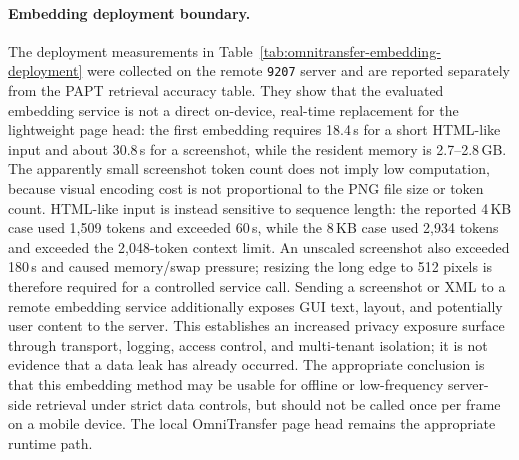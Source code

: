 \begin{table}[t]
  \centering
  \scriptsize
  \caption{Embedding deployment feasibility on the remote \texttt{9207} server.}
  \label{tab:omnitransfer-embedding-deployment}
\end{table}

\paragraph{Embedding deployment boundary.}
The deployment measurements in Table~\ref{tab:omnitransfer-embedding-deployment}
were collected on the remote \texttt{9207} server and are reported separately from the
PAPT retrieval accuracy table.  They show that the evaluated embedding service
is not a direct on-device, real-time replacement for the lightweight page head:
the first embedding requires 18.4\,s for a short HTML-like input and about
30.8\,s for a screenshot, while the resident memory is 2.7--2.8\,GB.  The
apparently small screenshot token count does not imply low computation, because
visual encoding cost is not proportional to the PNG file size or token count.
HTML-like input is instead sensitive to sequence length: the reported 4\,KB
case used 1,509 tokens and exceeded 60\,s, while the 8\,KB case used 2,934
tokens and exceeded the 2,048-token context limit.  An unscaled screenshot also
exceeded 180\,s and caused memory/swap pressure; resizing the long edge to 512
pixels is therefore required for a controlled service call.  Sending a
screenshot or XML to a remote embedding service additionally exposes GUI text,
layout, and potentially user content to the server.  This establishes an
increased privacy exposure surface through transport, logging, access control,
and multi-tenant isolation; it is not evidence that a data leak has already
occurred.  The appropriate conclusion is that this embedding method may be
usable for offline or low-frequency server-side retrieval under strict data
controls, but should not be called once per frame on a mobile device.  The
local OmniTransfer page head remains the appropriate runtime path.

